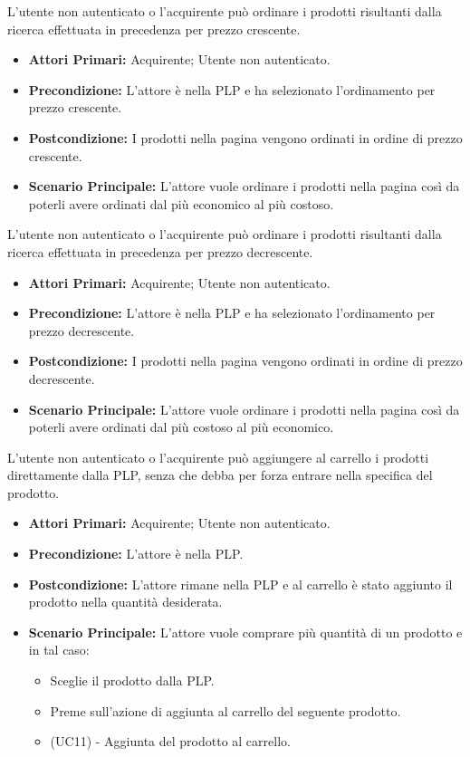 
L'utente non autenticato o l'acquirente può ordinare i prodotti risultanti dalla ricerca effettuata in precedenza per prezzo crescente.
\begin{itemize}
    \item \textbf{Attori Primari:} Acquirente; Utente non autenticato.
    \item \textbf{Precondizione:} L'attore è nella PLP e ha selezionato l'ordinamento per prezzo crescente.
    \item \textbf{Postcondizione:} I prodotti nella pagina vengono ordinati in ordine di prezzo crescente.
    \item \textbf{Scenario Principale:} L'attore vuole ordinare i prodotti nella pagina così da poterli avere ordinati dal più economico al più costoso.
\end{itemize}

L'utente non autenticato o l'acquirente può ordinare i prodotti risultanti dalla ricerca effettuata in precedenza per prezzo decrescente.
\begin{itemize}
    \item \textbf{Attori Primari:} Acquirente; Utente non autenticato.
    \item \textbf{Precondizione:} L'attore è nella PLP e ha selezionato l'ordinamento per prezzo decrescente.
    \item \textbf{Postcondizione:} I prodotti nella pagina vengono ordinati in ordine di prezzo decrescente.
    \item \textbf{Scenario Principale:} L'attore vuole ordinare i prodotti nella pagina così da poterli avere ordinati dal più costoso al più economico.
\end{itemize}

L'utente non autenticato o l'acquirente può aggiungere al carrello i prodotti direttamente dalla PLP, senza che debba per forza entrare nella  specifica del prodotto.
\begin{itemize}
    \item \textbf{Attori Primari:} Acquirente; Utente non autenticato.
    \item \textbf{Precondizione:} L'attore è nella PLP.
    \item \textbf{Postcondizione:} L'attore rimane nella PLP e al carrello è stato aggiunto il prodotto nella quantità desiderata.
    \item \textbf{Scenario Principale:} L'attore vuole comprare più quantità di un prodotto e in tal caso:
    \begin{itemize}
        \item Sceglie il prodotto dalla PLP.
        \item Preme sull'azione di aggiunta al carrello del seguente prodotto.
        \item (UC11) - Aggiunta del prodotto al carrello.
    \end{itemize}
\end{itemize}
